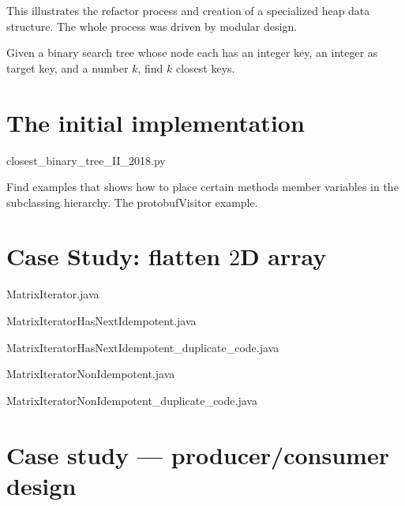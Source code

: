 This illustrates the refactor process and creation of a specialized heap data structure.
The whole process was driven by modular design.

Given a binary search tree whose node each has an integer key, an integer as target key, and a
number $k$, find $k$ closest keys.

\section{The initial implementation}


{closest_binary_tree_II_2018.py}

Find examples that shows how to place certain methods member variables in the subclassing
hierarchy.
The protobufVisitor example.

\begin{clisting}
    
\end{clisting}

\section{Case Study: flatten $2$D array}\label{sec:caseStudy:FlattenArray}


{MatrixIterator.java}


{MatrixIteratorHasNextIdempotent.java}


{MatrixIteratorHasNextIdempotent_duplicate_code.java}


{MatrixIteratorNonIdempotent.java}


{MatrixIteratorNonIdempotent_duplicate_code.java}


\section{Case study --- producer/consumer design}\label{sec:case-study-producer-consumer-design}

